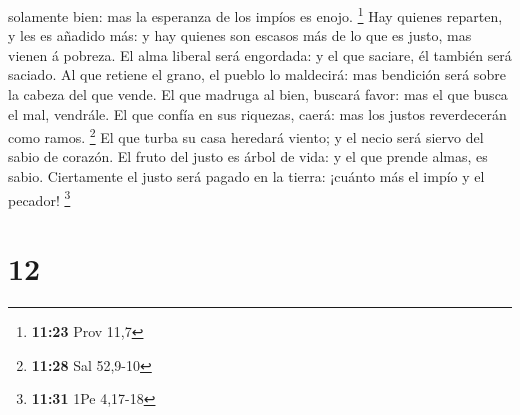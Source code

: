 solamente bien: mas la esperanza de los impíos es enojo. \footnote{\textbf{11:23}
  Prov 11,7}  Hay quienes reparten, y les es añadido más: y
hay quienes son escasos más de lo que es justo, mas vienen á pobreza.
 El alma liberal será engordada: y el que saciare, él
también será saciado.  Al que retiene el grano, el pueblo
lo maldecirá: mas bendición será sobre la cabeza del que vende.
 El que madruga al bien, buscará favor: mas el que busca el
mal, vendrále.  El que confía en sus riquezas, caerá: mas
los justos reverdecerán como ramos. \footnote{\textbf{11:28} Sal 52,9-10}
 El que turba su casa heredará viento; y el necio será
siervo del sabio de corazón.  El fruto del justo es árbol
de vida: y el que prende almas, es sabio.  Ciertamente el
justo será pagado en la tierra: ¡cuánto más el impío y el pecador!
\footnote{\textbf{11:31} 1Pe 4,17-18}

\hypertarget{section-11}{%
\section{12}\label{section-11}}

